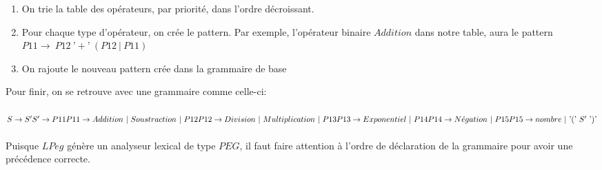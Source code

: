 \documentclass{article}
\begin{document}
\begin{enumerate}
	\item On trie la table des opérateurs, par priorité, dans l'ordre décroissant.
	\item Pour chaque type d'opérateur, on crée le pattern. Par exemple, l'opérateur binaire $Addition$ dans notre table, aura le pattern \\ $P11 \rightarrow \ P12 \ \textrm{'}+\textrm{'} \ (P12 \ | \ P11)$
	\item On rajoute le nouveau pattern crée dans la grammaire de base
\end{enumerate}
Pour finir, on se retrouve avec une grammaire comme celle-ci: \\ \\
\begin{math}
S \rightarrow S' \\
S' \rightarrow P11 \\
P11 \rightarrow Addition \ | \ Soustraction \ | \ P12 \\
P12 \rightarrow Division \ | \ Multiplication \ | \ P13 \\
P13 \rightarrow Exponentiel \ | \ P14 \\
P14 \rightarrow N\acute{e}gation \ | \ P15 \\
P15 \rightarrow nombre \ | \ \textrm{'}(\textrm{'} \ S' \ \textrm{'})\textrm{'}
\end{math} \\ \\
Puisque $LPeg$ génère un analyseur lexical de type $PEG$, il faut faire attention à l'ordre de déclaration de la grammaire pour avoir une précédence correcte.
\end{document}
